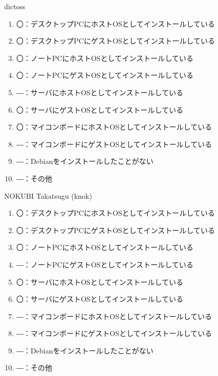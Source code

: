 \begin{prework}{ dictoss }
  \begin{enumerate}
  \item 〇：デスクトップPCにホストOSとしてインストールしている
  \item 〇：デスクトップPCにゲストOSとしてインストールしている
  \item 〇：ノートPCにホストOSとしてインストールしている
  \item 〇：ノートPCにゲストOSとしてインストールしている
  \item ―：サーバにホストOSとしてインストールしている
  \item 〇：サーバにゲストOSとしてインストールしている
  \item 〇：マイコンボードにホストOSとしてインストールしている
  \item ―：マイコンボードにゲストOSとしてインストールしている
  \item ―：Debianをインストールしたことがない
  \item ―：その他
  \end{enumerate}
\end{prework}

\begin{prework}{ NOKUBI Takatsugu (knok) }
  \begin{enumerate}
  \item 〇：デスクトップPCにホストOSとしてインストールしている
  \item 〇：デスクトップPCにゲストOSとしてインストールしている
  \item 〇：ノートPCにホストOSとしてインストールしている
  \item ―：ノートPCにゲストOSとしてインストールしている
  \item 〇：サーバにホストOSとしてインストールしている
  \item 〇：サーバにゲストOSとしてインストールしている
  \item ―：マイコンボードにホストOSとしてインストールしている
  \item ―：マイコンボードにゲストOSとしてインストールしている
  \item ―：Debianをインストールしたことがない
  \item ―：その他
  \end{enumerate}
\end{prework}

